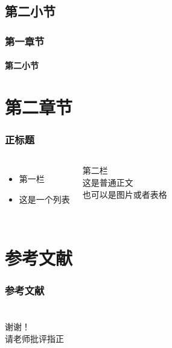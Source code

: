 \documentclass{beamer}
\begin{document}
\subsection{第二小节}

\begin{frame}
    \frametitle{第一章节}
    \framesubtitle{第二小节}
\end{frame}

\section{第二章节}

\begin{frame}
    \frametitle{正标题}
    \begin{columns}
        \begin{itemize}
            \item 第一栏
            \item 这是一个列表
        \end{itemize}
        第二栏\\
        这是普通正文\\
        也可以是图片或者表格
    \end{columns}
\end{frame}

\section{参考文献}

\begin{frame}[allowframebreaks]
    \frametitle{参考文献}
    \small
    
    
\end{frame}

\section*{}


\begin{frame}
    \centering
    \Huge 谢谢！\\
    请老师批评指正
\end{frame}
\end{document}
